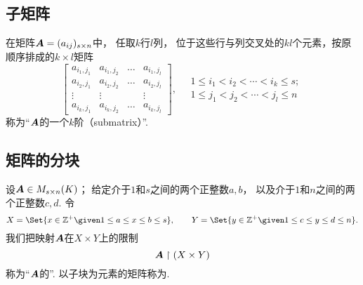 \subsection{子矩阵}
\begin{definition}
在矩阵\(\boldsymbol{A}=(a_{ij})_{s \times n}\)中，
任取\(k\)行\(l\)列，
位于这些行与列交叉处的\(kl\)个元素，按原顺序排成的\(k \times l\)矩阵\begin{equation*}
	\begin{bmatrix}
		a_{i_1,j_1} & a_{i_1,j_2} & \dots & a_{i_1,j_l} \\
		a_{i_2,j_1} & a_{i_2,j_2} & \dots & a_{i_2,j_l} \\
		\vdots & \vdots & & \vdots \\
		a_{i_k,j_1} & a_{i_k,j_2} & \dots & a_{i_k,j_l}
	\end{bmatrix},
	\quad
	\begin{array}{c}
		1 \leq i_1 < i_2 < \dotsb < i_k \leq s; \\
		1 \leq j_1 < j_2 < \dotsb < j_l \leq n
	\end{array}
\end{equation*}称为“\(\boldsymbol{A}\)的一个\(k\)阶（submatrix）”.
\end{definition}

\subsection{矩阵的分块}
\begin{definition}
设\(\boldsymbol{A} \in M_{s \times n}(K)\)；
给定介于\(1\)和\(s\)之间的两个正整数\(a,b\)，
以及介于\(1\)和\(n\)之间的两个正整数\(c,d\).
令\begin{equation*}
	X=\Set{ x\in\mathbb{Z}^+ \given 1 \leq a \leq x \leq b \leq s },
	\qquad
	Y=\Set{ y\in\mathbb{Z}^+ \given 1 \leq c \leq y \leq d \leq n }.
\end{equation*}
我们把映射\(\boldsymbol{A}\)在\(X \times Y\)上的限制\begin{equation*}
	\boldsymbol{A}\upharpoonright(X \times Y)
\end{equation*}称为“\(\boldsymbol{A}\)的”.
以子块为元素的矩阵称为.
\end{definition}

